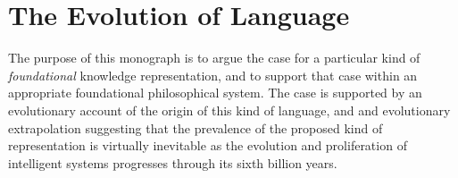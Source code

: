 \section{The Evolution of Language}

The purpose of this monograph is to argue the case for a particular kind of \emph{foundational} knowledge representation, and to support that case within an appropriate foundational philosophical system.
The case is supported by an evolutionary account of the origin of this kind of language, and and evolutionary extrapolation suggesting that the prevalence of the proposed kind of representation is virtually inevitable as the evolution and proliferation of intelligent systems progresses through its sixth billion years.


